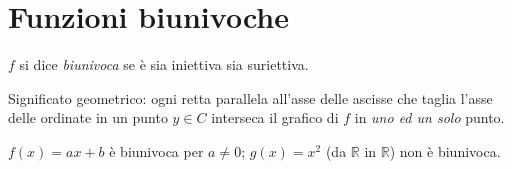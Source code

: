 \documentclass[11pt,a4paper]{article}
\begin{document}
\section{Funzioni biunivoche}

\begin{definizione}
$f$ si dice \emph{biunivoca} se è sia iniettiva sia suriettiva.
\end{definizione}

Significato geometrico: ogni retta parallela all'asse delle ascisse che taglia l'asse delle ordinate in un punto $y \in C$ interseca il grafico di $f$ in \emph{uno ed un solo} punto.

\begin{esempio}
$f(x) = ax + b$ è biunivoca per $a \neq 0$; $g(x) = x^2$ (da $\mathbb{R}$ in $\mathbb{R}$) non è biunivoca.
\end{esempio}
\end{document}
